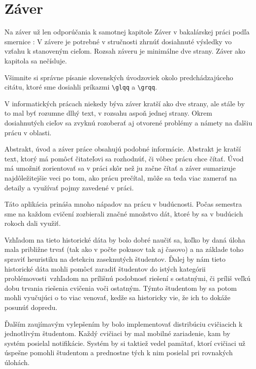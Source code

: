\chapter*{Záver}  %

Na záver už len odporúčania k samotnej kapitole Záver v bakalárskej
práci podľa smernice \cite{smernica}:  \glqq{}V závere je potrebné v
stručnosti zhrnúť dosiahnuté výsledky vo vzťahu k stanoveným
cieľom. Rozsah záveru je minimálne dve strany. Záver ako kapitola sa
nečísluje.\grqq{}

Všimnite si správne písanie slovenských úvodzoviek okolo
predchádzajúceho citátu, ktoré sme dosiahli príkazmi \verb'\glqq' a
\verb'\grqq'.

V informatických prácach niekedy býva záver kratší ako dve strany, ale
stále by to mal byť rozumne dlhý text, v rozsahu aspoň jednej strany.
Okrem dosiahnutých cieľov sa zvyknú rozoberať aj otvorené problémy a
námety na ďalšiu prácu v oblasti.

Abstrakt, úvod a záver práce obsahujú podobné informácie. Abstrakt je
kratší text, ktorý má pomôcť čitateľovi sa rozhodnúť, či vôbec prácu
chce čítať. Úvod má umožniť zorientovať sa v práci skôr než ju začne
čítať a záver sumarizuje najdôležitejšie veci po tom, ako prácu
prečítal, môže sa teda viac zamerať na detaily a využívať pojmy
zavedené v práci.



Táto aplikácia prináša mnoho nápadov na prácu v budúcnosti. Počas semestra
sme na každom cvičení zozbierali značné množstvo dát, ktoré by sa v budúcich rokoch
dali využiť.

Vzhľadom na tieto historické dáta by bolo dobré naučiť sa, koľko by daná úloha mala
približne trvať (tak ako v počte pokusov tak aj časovo) a na základe toho spraviť
heuristiku na detekciu zaseknutých študentov.
Ďalej by nám tieto historické dáta mohli pomôcť zaradiť študentov do istých
\glqq kategórii problémovosti\grqq~vzhľadom na prílišnú podobnosť riešení s ostatnými,
či príliš veľkú dobu trvania riešenia cvičenia voči ostatným. Týmto študentom by sa
potom mohli vyučujúci o to viac venovať, kedže sa historicky vie, že ich to dokáže
posunúť dopredu.

Ďalším zaujímavým vylepšením by bolo implementovať distribúciu cvičiacich k jednotlivým
študentom. Každý cvičiaci by mal mobilné zariadenie, kam by systém posielal
notifikácie. Systém by si taktiež vedel pamätať, ktorí cvičiaci už úspešne pomohli
študentom a prednostne tých k nim posielal pri rovnakých úlohách.


